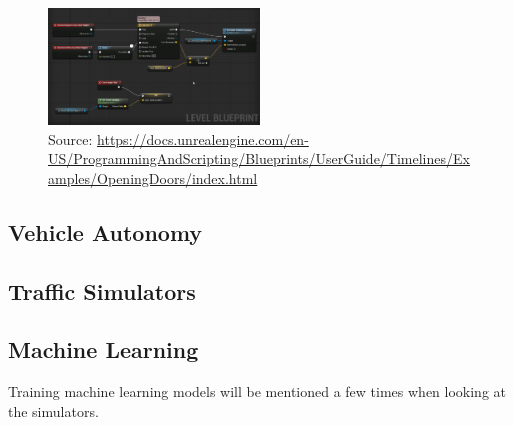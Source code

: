 \begin{figure}[H] 
    \centering
    \includegraphics[width=0.5\textwidth]{OtherImages/UEBlueprint.png}
    \caption{Source: \url{https://docs.unrealengine.com/en-US/ProgrammingAndScripting/Blueprints/UserGuide/Timelines/Examples/OpeningDoors/index.html}}    \label{UnrealEngineBlueprint}

\end{figure}

\subsection{Vehicle Autonomy}
\subsection{Traffic Simulators}


\subsection{Machine Learning}
Training machine learning models will be mentioned a few times when looking at the simulators.